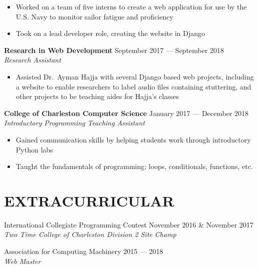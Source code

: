 \documentclass[letterpaper,14pt]{extarticle}
\begin{document}
  \begin{itemize}[itemsep=0pt, topsep=2pt]
    \item{Worked on a team of five interns to create a web application for use by the U.S. Navy to monitor sailor fatigue and proficiency}
    \item{Took on a lead developer role, creating the website in Django} \end{itemize}

  \textbf{Research in Web Development}
  \hspace*{\fill}
  \textcolor{color2}{September 2017 --- September 2018}
  \\ 
  \textcolor{color2}{
    \textit{
      \qquad{} Research Assistant
    }
  }

  \begin{itemize}[itemsep=0pt, topsep=2pt]
    \item{Assisted Dr.\ Ayman Hajja with several Django based web projects, including a website to enable researchers to label audio files containing stuttering, and other projects to be teaching aides for Hajja’s classes}
  \end{itemize}


  \textbf{College of Charleston Computer Science}
  \hspace*{\fill}
  \textcolor{color2}{January 2017 --- December 2018}
  \\ 
  \textcolor{color2}{
    \textit{
      \qquad{} Introductory Programming Teaching Assistant
    }
  }

  \begin{itemize}[itemsep=0pt, topsep=2pt]
    \item{Gained communication skills by helping students work through introductory Python labs}
    \item{Taught the fundamentals of programming: loops, conditionals, functions, etc.}
  \end{itemize}


\section*{EXTRACURRICULAR}
  {International Collegiate Programming Contest}
  \hspace*{\fill}
  \textcolor{color2}{November 2016 \& November 2017}
  \\ 
  \textcolor{color2}{
    \textit{
      \qquad{} Two Time College of Charleston Division 2 Site Champ
    }
  }

  \vspace*{4pt}

  {Association for Computing Machinery}
  \hspace*{\fill}
  \textcolor{color2}{2015 --- 2018}
  \\ 
  \textcolor{color2}{
    \textit{
      \qquad{} Web Master
    }
  }
\end{document}
